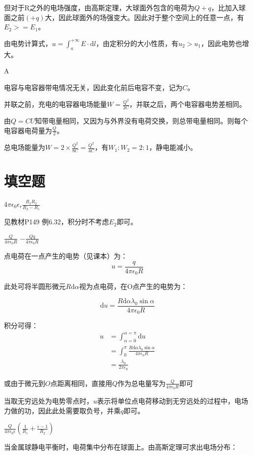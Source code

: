 \documentclass[b5paper,opensource]{qyxf-book}
\newcommand{\di}[1]{\mathrm{d}#1}
\begin{document}
但对于R之外的电场强度，由高斯定理，大球面外包含的电荷为$ Q+q $，比加入球面之前$ (+q) $大，因此球面外的场强变大。因此对于整个空间上的任意一点，有$ E_2>=E_1 $。

由电势计算式，$ u=\int_a^{+\infty} E\cdot\di{l} $，由定积分的大小性质，有$ u_2>u_1 $，因此电势也增大。

A

\solve 电容与电容器带电情况无关，因此变化前后电容不变，记为$ C $。

并联之前，充电的电容器电场能量$ W=\frac{Q^2}{2C} $，并联之后，两个电容器电势差相同。

由$ Q=CU $知带电量相同，又因为与外界没有电荷交换，则总带电量相同。则每个电容器电荷量为$ \frac{Q}{2} $。

总电场能量为$ W=2\times \frac{Q^2}{8C}=\frac{Q^2}{4C} $，有$ W_1:W_2=2:1 $，静电能减小。

\section{填空题}
 $4\pi\epsilon_0\epsilon_r\frac{R_1R_2}{R_2-R_1}$

\solve 见教材P149 例6.32，积分时不考虑$E_2$即可。

 $\frac{Q}{4\pi\epsilon_0 R}$ \quad $-\frac{Qq}{4\pi\epsilon_0 R}$

\solve 点电荷在一点产生的电势（见课本）为：
\[u=\frac{q}{4\pi\epsilon_0 R}\]

此处可将半圆形微元$R\di{\alpha}$视为点电荷，在O点产生的电势为：

\[\di{u}=\frac{R\di{\alpha}\lambda_0\sin\alpha}{4\pi\epsilon_0 R}\]

积分可得：
\begin{align*}
u&=\int_{\alpha=0}^{\alpha=\pi} \di{u}\\
&=\int_0^{\pi} \frac{R\di{\alpha}\lambda_0\sin\alpha}{4\pi\epsilon_0 R}\\
&=\frac{\lambda_0}{2\pi\epsilon_0}
\end{align*}

或由于微元到$O$点距离相同，直接用$Q$作为总电量写为$\frac{Q}{4\pi\epsilon_0 R}$即可

当取无穷远处为电势零点时，$ u $表示将单位点电荷移动到无穷远处的过程中，电场力做的功，因此此处需要取负号，并乘$q$即可。

 $\frac{Q}{4\pi\epsilon_0\epsilon}\left(\frac{1}{R_1}+\frac{\epsilon-1}{R_2}\right)$

\solve 当金属球静电平衡时，电荷集中分布在球面上。由高斯定理可求出电场分布：
\end{document}
